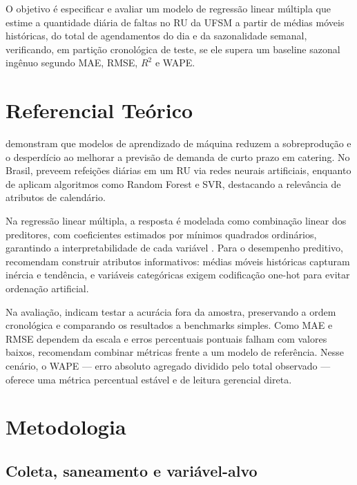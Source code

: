 \documentclass[11pt]{article}
\begin{document}
O objetivo é especificar e avaliar um modelo de regressão linear múltipla que estime a quantidade diária de faltas no RU da UFSM a partir de médias móveis históricas, do total de agendamentos do dia e da sazonalidade semanal, verificando, em partição cronológica de teste, se ele supera um baseline sazonal ingênuo segundo MAE, RMSE, $R^2$ e WAPE.

\section{Referencial Teórico}

\citet{rodrigues2024machine} demonstram que modelos de aprendizado de máquina reduzem a sobreprodução e o desperdício ao melhorar a previsão de demanda de curto prazo em catering. No Brasil, \citet{rocha2011utilizaccao} preveem refeições diárias em um RU via redes neurais artificiais, enquanto de \citet{de2021metodo} aplicam algoritmos como Random Forest e SVR, destacando a relevância de atributos de calendário.

Na regressão linear múltipla, a resposta é modelada como combinação linear dos preditores, com coeficientes estimados por mínimos quadrados ordinários, garantindo a interpretabilidade de cada variável \citep{gareth2023introduction}. Para o desempenho preditivo, \citet{kuhn2019feature} recomendam construir atributos informativos: médias móveis históricas capturam inércia e tendência, e variáveis categóricas exigem codificação one-hot para evitar ordenação artificial.

Na avaliação, \citet{hyndman2012principles} indicam testar a acurácia fora da amostra, preservando a ordem cronológica e comparando os resultados a benchmarks simples. Como MAE e RMSE dependem da escala e erros percentuais pontuais falham com valores baixos, \citet{hyndman2006another} recomendam combinar métricas frente a um modelo de referência. Nesse cenário, o WAPE — erro absoluto agregado dividido pelo total observado — oferece uma métrica percentual estável e de leitura gerencial direta.

\section{Metodologia}

\subsection{Coleta, saneamento e variável-alvo}
\end{document}
